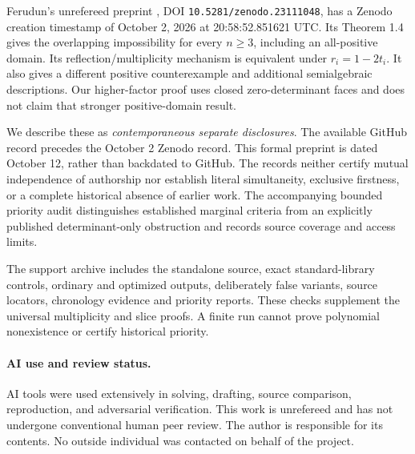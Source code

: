 \documentclass[11pt]{article}
\begin{document}
Ferudun's unrefereed preprint \cite{Ferudun}, DOI \texttt{10.5281/zenodo.23111048}, has a Zenodo creation timestamp of October 2, 2026 at 20:58:52.851621 UTC. Its Theorem 1.4 gives the overlapping impossibility for every \(n\geq3\), including an all-positive domain. Its reflection/multiplicity mechanism is equivalent under \(r_i=1-2t_i\). It also gives a different positive counterexample and additional semialgebraic descriptions. Our higher-factor proof uses closed zero-determinant faces and does not claim that stronger positive-domain result.

We describe these as \emph{contemporaneous separate disclosures}. The available GitHub record precedes the October 2 Zenodo record. This formal preprint is dated October 12, rather than backdated to GitHub. The records neither certify mutual independence of authorship nor establish literal simultaneity, exclusive firstness, or a complete historical absence of earlier work. The accompanying bounded priority audit distinguishes established marginal criteria from an explicitly published determinant-only obstruction and records source coverage and access limits.

The support archive includes the standalone source, exact standard-library controls, ordinary and optimized outputs, deliberately false variants, source locators, chronology evidence and priority reports. These checks supplement the universal multiplicity and slice proofs. A finite run cannot prove polynomial nonexistence or certify historical priority.

\paragraph{AI use and review status.}
AI tools were used extensively in solving, drafting, source comparison, reproduction, and adversarial verification. This work is unrefereed and has not undergone conventional human peer review. The author is responsible for its contents. No outside individual was contacted on behalf of the project.
\end{document}
